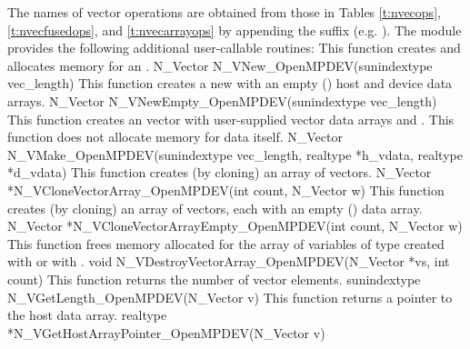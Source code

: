 The names of vector operations are obtained from those in Tables
\ref{t:nvecops}, \ref{t:nvecfusedops}, and \ref{t:nvecarrayops} by appending the
suffix  (e.g. ). The module
{\nvecopenmpdev} provides the following additional user-callable routines: 
{
  This function creates and allocates memory for an {\nvecopenmpdev} .
}
{
  N\_Vector N\_VNew\_OpenMPDEV(sunindextype vec\_length)
}
{
  This function creates a new {\nvecopenmpdev}  with an empty
  () host and device data arrays.
}
{
  N\_Vector N\_VNewEmpty\_OpenMPDEV(sunindextype vec\_length)
}
{
 This function creates an {\nvecopenmpdev} vector with user-supplied vector data
 arrays  and . This function does not allocate memory for
 data itself.
}
{
  N\_Vector N\_VMake\_OpenMPDEV(sunindextype vec\_length, realtype *h\_vdata,
  realtype *d\_vdata)
}
{
 This function creates (by cloning) an array of  {\nvecopenmpdev} vectors. 
}
{
 N\_Vector *N\_VCloneVectorArray\_OpenMPDEV(int count, N\_Vector w)
}
{
 This function creates (by cloning) an array of  {\nvecopenmpdev} vectors, each with an
 empty () data array.
}
{
 N\_Vector *N\_VCloneVectorArrayEmpty\_OpenMPDEV(int count, N\_Vector w)
}
{
 This function frees memory allocated for the array of  variables of type
  created with  or with \newline
 .
}
{
 void N\_VDestroyVectorArray\_OpenMPDEV(N\_Vector *vs, int count)
}
{
 This function returns the number of vector elements.
}
{
 sunindextype N\_VGetLength\_OpenMPDEV(N\_Vector v)
}
{
 This function returns a pointer to the host data array.
}
{
 realtype *N\_VGetHostArrayPointer\_OpenMPDEV(N\_Vector v)
}
